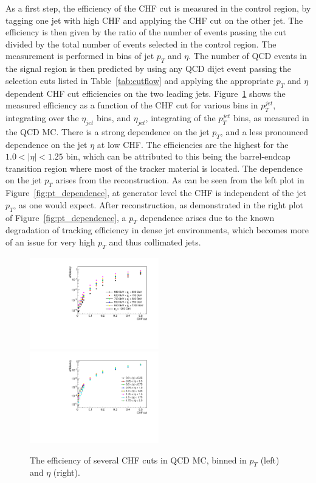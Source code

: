 As a first step, the efficiency of the CHF cut is measured in the control region, by tagging one jet with high CHF and applying the CHF cut on the other jet. The efficiency is then given by the ratio of the number of events passing the cut divided by the total number of events selected in the control region. The measurement is performed in bins of jet $p_T$ and $\eta$. The number of \ac{QCD} events in the signal region is then predicted by using any \ac{QCD} dijet event passing the selection cuts listed in Table~\ref{tab:cutflow} and applying the appropriate $p_T$ and $\eta$ dependent CHF cut efficiencies on the two leading jets. Figure~\ref{fig:efficiencies} shows the measured efficiency as a function of the CHF cut for various bins in $p_T^{jet}$, integrating over the $\eta_{jet}$ bins, and $\eta_{jet}$, integrating of the $p_T^{jet}$ bins, as measured in the \ac{QCD} MC. There is a strong dependence on the jet $p_T$, and a less pronounced dependence on the jet $\eta$ at low CHF. The efficiencies are the highest for the $1.0 < |\eta| < 1.25$ bin, which can be attributed to this being the barrel-endcap transition region where most of the tracker material is located. The dependence on the jet $p_T$ arises from the reconstruction. As can be seen from the left plot in Figure~\ref{fig:pt_dependence}, at generator level the CHF is independent of the jet $p_T$, as one would expect. After reconstruction, as demonstrated in the right plot of Figure~\ref{fig:pt_dependence}, a $p_T$ dependence arises due to the known degradation of tracking efficiency in dense jet environments, which becomes more of an issue for very high $p_T$ and thus collimated jets.

\begin{figure}[ht]
  \centering
  \includegraphics[width=0.5\textwidth]{figures/eff1D_pt_newtrigger.pdf}\hfill%
  \includegraphics[width=0.5\textwidth]{figures/eff1D_eta_newtrigger.pdf}
  \caption{The efficiency of several CHF cuts in \ac{QCD} MC, binned in $p_T$ (left) and $\eta$ (right).}
  \label{fig:efficiencies}
\end{figure}

